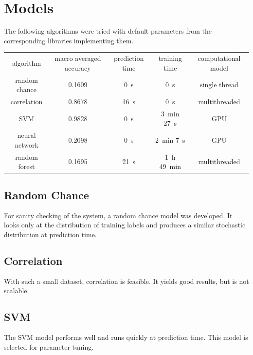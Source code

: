 \documentclass{article}
\begin{document}
\section{Models}
The following algorithms were tried with default parameters from the corresponding libraries implementing them.
\\ \par
{}
\begin{tabular}{ c | c | c | c | c }
algorithm      & macro averaged accuracy & prediction time  & training time                    & computational model \\
random chance  & 0.1609                  & \SI{0}{\second}  & \SI{0}{\second}                  & single thread \\
correlation    & 0.8678                  & \SI{16}{\second} & \SI{0}{\second}                  & multithreaded \\
SVM            & 0.9828                  & \SI{0}{\second}  & \SI{3}{\minute} \SI{27}{\second} & GPU \\
neural network & 0.2098                  & \SI{0}{\second}  & \SI{2}{\minute} \SI{7}{\second}  & GPU \\
random forest  & 0.1695                  & \SI{21}{\second} & \SI{1}{\hour} \SI{49}{\minute}   & multithreaded \\
\end{tabular}


\subsection{Random Chance}
For sanity checking of the system, a random chance model was developed.
It looks only at the distribution of training labels and produces a similar stochastic distribution at prediction time.


\subsection{Correlation}
With such a small dataset, correlation is feasible.
It yields good results, but is not scalable.


\subsection{SVM}
The SVM model performs well and runs quickly at prediction time.
This model is selected for parameter tuning.
\end{document}
